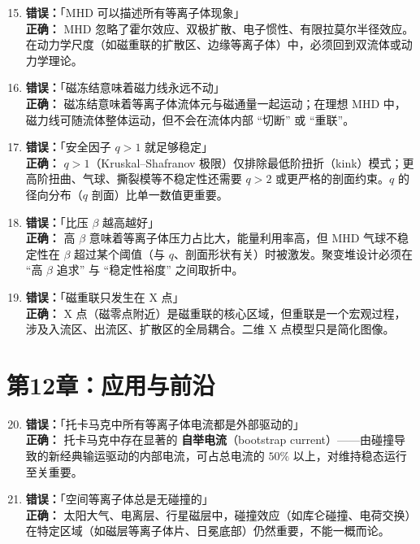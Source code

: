 \documentclass[12pt,a4paper,openany,oneside]{book}
\begin{document}
\begin{warning}{}{}
\begin{enumerate}
\setcounter{enumi}{14}
\item \textbf{错误：}「MHD 可以描述所有等离子体现象」\\
\textbf{正确：} MHD 忽略了霍尔效应、双极扩散、电子惯性、有限拉莫尔半径效应。在动力学尺度（如磁重联的扩散区、边缘等离子体）中，必须回到双流体或动力学理论。

\item \textbf{错误：}「磁冻结意味着磁力线永远不动」\\
\textbf{正确：} 磁冻结意味着等离子体流体元与磁通量一起运动；在理想 MHD 中，磁力线可随流体整体运动，但不会在流体内部 ``切断'' 或 ``重联''。

\item \textbf{错误：}「安全因子 $q>1$ 就足够稳定」\\
\textbf{正确：} $q>1$（Kruskal--Shafranov 极限）仅排除最低阶扭折（kink）模式；更高阶扭曲、气球、撕裂模等不稳定性还需要 $q>2$ 或更严格的剖面约束。$q$ 的径向分布（$q$ 剖面）比单一数值更重要。

\item \textbf{错误：}「比压 $\beta$ 越高越好」\\
\textbf{正确：} 高 $\beta$ 意味着等离子体压力占比大，能量利用率高，但 MHD 气球不稳定性在 $\beta$ 超过某个阈值（与 $q$、剖面形状有关）时被激发。聚变堆设计必须在 ``高 $\beta$ 追求'' 与 ``稳定性裕度'' 之间取折中。

\item \textbf{错误：}「磁重联只发生在 X 点」\\
\textbf{正确：} X 点（磁零点附近）是磁重联的核心区域，但重联是一个宏观过程，涉及入流区、出流区、扩散区的全局耦合。二维 X 点模型只是简化图像。
\end{enumerate}
\end{warning}


\section{第12章：应用与前沿}

\begin{warning}{}{}
\begin{enumerate}
\setcounter{enumi}{19}
\item \textbf{错误：}「托卡马克中所有等离子体电流都是外部驱动的」\\
\textbf{正确：} 托卡马克中存在显著的 \textbf{自举电流}（bootstrap current）——由碰撞导致的新经典输运驱动的内部电流，可占总电流的 $50\%$ 以上，对维持稳态运行至关重要。

\item \textbf{错误：}「空间等离子体总是无碰撞的」\\
\textbf{正确：} 太阳大气、电离层、行星磁层中，碰撞效应（如库仑碰撞、电荷交换）在特定区域（如磁层等离子体片、日冕底部）仍然重要，不能一概而论。
\end{enumerate}
\end{warning}
\end{document}
